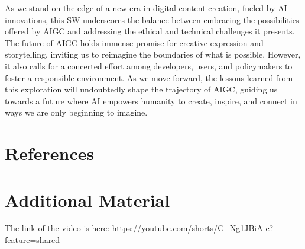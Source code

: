 \documentclass[11pt,a4paper,oneside]{report}
\begin{document}
As we stand on the edge of a new era in digital content creation, fueled by AI innovations, this SW underscores the balance between embracing the possibilities offered by AIGC and addressing the ethical and technical challenges it presents. 
The future of AIGC holds immense promise for creative expression and storytelling, inviting us to reimagine the boundaries of what is possible. However, it also calls for a concerted effort among developers, users, and policymakers to foster a responsible environment. 
As we move forward, the lessons learned from this exploration will undoubtedly shape the trajectory of AIGC, guiding us towards a future where AI empowers humanity to create, inspire, and connect in ways we are only beginning to imagine.


\chapter*{References}
\label{references}



\printbibliography[heading=none]



\appendix

\chapter{Additional Material}
\label{appendix-a}

The link of the video is here: \url{https://youtube.com/shorts/C_Ng1JBiA-c?feature=shared}
\end{document}
